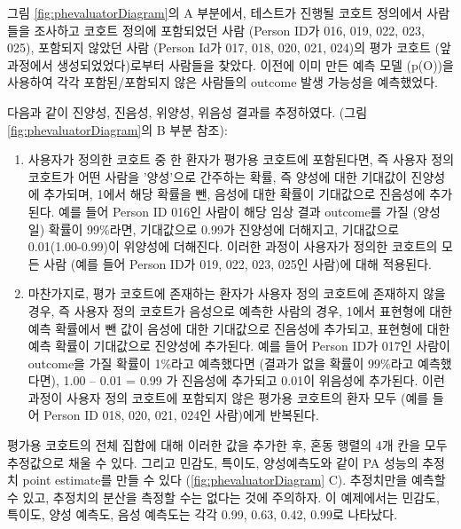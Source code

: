 \documentclass[10.5pt]{book}
\theoremstyle{definition}
\theoremstyle{definition}
\theoremstyle{definition}
\theoremstyle{remark}
\begin{document}
그림 \ref{fig:phevaluatorDiagram}의 A 부분에서, 테스트가 진행될 코호트
정의에서 사람들을 조사하고 코호트 정의에 포함되었던 사람 (Person ID가
016, 019, 022, 023, 025), 포함되지 않았던 사람 (Person Id가 017, 018,
020, 021, 024)의 평가 코호트 (앞 과정에서 생성되었었다)로부터 사람들을
찾았다. 이전에 이미 만든 예측 모델 (p(O))을 사용하여 각각
포함된/포함되지 않은 사람들의 outcome 발생 가능성을 예측했었다.

다음과 같이 진양성, 진음성, 위양성, 위음성 결과를 추정하였다. (그림
\ref{fig:phevaluatorDiagram}의 B 부분 참조):

\begin{enumerate}
\def\labelenumi{\arabic{enumi}.}
\item
  사용자가 정의한 코호트 중 한 환자가 평가용 코호트에 포함된다면, 즉
  사용자 정의 코호트가 어떤 사람을 '양성'으로 간주하는 확률, 즉 양성에
  대한 기대값이 진양성에 추가되며, 1에서 해당 확률을 뺀, 음성에 대한
  확률이 기대값으로 진음성에 추가된다. 예를 들어 Person ID 016인 사람이
  해당 임상 결과 outcome를 가질 (양성일) 확률이 99\%라면, 기대값으로
  0.99가 진양성에 더해지고, 기대값으로 0.01(1.00-0.99)이 위양성에
  더해진다. 이러한 과정이 사용자가 정의한 코호트의 모든 사람 (예를 들어
  Person ID가 019, 022, 023, 025인 사람)에 대해 적용된다.
\item
  마찬가지로, 평가 코호트에 존재하는 환자가 사용자 정의 코호트에
  존재하지 않을 경우, 즉 사용자 정의 코호트가 음성으로 예측한 사람의
  경우, 1에서 표현형에 대한 예측 확률에서 뺀 값이 음성에 대한 기대값으로
  진음성에 추가되고, 표현형에 대한 예측 확률이 기대값으로 진양성에
  추가된다. 예를 들어 Person ID가 017인 사람이 outcome을 가질 확률이
  1\%라고 예측했다면 (결과가 없을 확률이 99\%라고 예측했다면), 1.00 --
  0.01 = 0.99 가 진음성에 추가되고 0.01이 위음성에 추가된다. 이런 과정이
  사용자 정의 코호트에 포함되지 않은 평가용 코호트의 환자 모두 (예를
  들어 Person ID 018, 020, 021, 024인 사람)에게 반복된다.
\end{enumerate}

평가용 코호트의 전체 집합에 대해 이러한 값을 추가한 후, 혼동 행렬의 4개
칸을 모두 추정값으로 채울 수 있다. 그리고 민감도, 특이도, 양성예측도와
같이 PA 성능의 추정치 point estimate를 만들 수 있다
(\ref{fig:phevaluatorDiagram} C). 추정치만을 예측할 수 있고, 추정치의
분산을 측정할 수는 없다는 것에 주의하자. 이 예제에서는 민감도, 특이도,
양성 예측도, 음성 예측도는 각각 0.99, 0.63, 0.42, 0.99로 나타났다.
\end{document}
